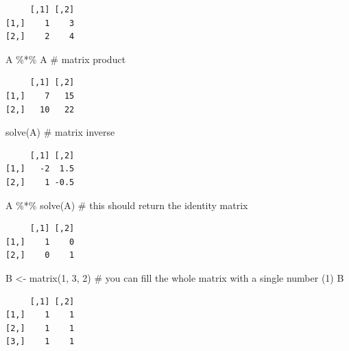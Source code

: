 \documentclass[
  letterpaper,
  DIV=11,
  numbers=noendperiod]{scrreprt}
\newenvironment{Shaded}{\begin{snugshade}}{\end{snugshade}}
\newcommand{\CommentTok}[1]{\textcolor[rgb]{0.37,0.37,0.37}{#1}}
\newcommand{\DecValTok}[1]{\textcolor[rgb]{0.68,0.00,0.00}{#1}}
\newcommand{\FunctionTok}[1]{\textcolor[rgb]{0.28,0.35,0.67}{#1}}
\newcommand{\NormalTok}[1]{\textcolor[rgb]{0.00,0.23,0.31}{#1}}
\newcommand{\OtherTok}[1]{\textcolor[rgb]{0.00,0.23,0.31}{#1}}
\newcommand{\SpecialCharTok}[1]{\textcolor[rgb]{0.37,0.37,0.37}{#1}}
\begin{document}
\begin{verbatim}
     [,1] [,2]
[1,]    1    3
[2,]    2    4
\end{verbatim}

\begin{Shaded}
\begin{Highlighting}[]
\NormalTok{A }\SpecialCharTok{\%*\%}\NormalTok{ A }\CommentTok{\# matrix product}
\end{Highlighting}
\end{Shaded}

\begin{verbatim}
     [,1] [,2]
[1,]    7   15
[2,]   10   22
\end{verbatim}

\begin{Shaded}
\begin{Highlighting}[]
\FunctionTok{solve}\NormalTok{(A) }\CommentTok{\# matrix inverse}
\end{Highlighting}
\end{Shaded}

\begin{verbatim}
     [,1] [,2]
[1,]   -2  1.5
[2,]    1 -0.5
\end{verbatim}

\begin{Shaded}
\begin{Highlighting}[]
\NormalTok{A }\SpecialCharTok{\%*\%} \FunctionTok{solve}\NormalTok{(A) }\CommentTok{\# this should return the identity matrix}
\end{Highlighting}
\end{Shaded}

\begin{verbatim}
     [,1] [,2]
[1,]    1    0
[2,]    0    1
\end{verbatim}

\begin{Shaded}
\begin{Highlighting}[]
\NormalTok{B }\OtherTok{\textless{}{-}} \FunctionTok{matrix}\NormalTok{(}\DecValTok{1}\NormalTok{, }\DecValTok{3}\NormalTok{, }\DecValTok{2}\NormalTok{) }\CommentTok{\# you can fill the whole matrix with a single number (1)}
\NormalTok{B}
\end{Highlighting}
\end{Shaded}

\begin{verbatim}
     [,1] [,2]
[1,]    1    1
[2,]    1    1
[3,]    1    1
\end{verbatim}
\end{document}
